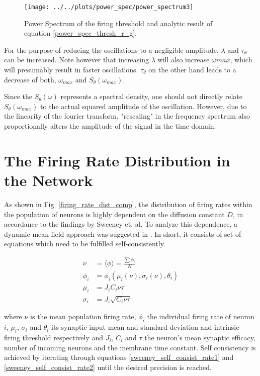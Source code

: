 \documentclass[10pt,a4paper]{article}
\begin{document}
\begin{figure}
\texttt{[image: ../../plots/power\_spec/power\_spectrum3]}
\caption{Power Spectrum of the firing threshold and analytic result of equation \eqref{power_spec_thresh_r_g}.}
\label{power_spec_thresh_sim_vs_an}
\end{figure}

For the purpose of reducing the oscillations to a negligible amplitude, $\lambda$ and $\tau_\theta$ can be increased. Note however that increasing $\lambda$ will also increase $\omega{max}$, which will presumably result in faster oscillations. $\tau_\theta$ on the other hand leads to a decrease of both, $\omega_{max}$ and $S_\theta(\omega_{max})$.

Since the $S_\theta(\omega)$ represents a spectral density, one should not directly relate $S_\theta(\omega_{max})$ to the actual squared amplitude of the oscillation. However, due to the linearity of the fourier transform, "rescaling" in the frequency spectrum also proportionally alters the amplitude of the signal in the time domain.    

\section{The Firing Rate Distribution in the Network}

As shown in Fig. \ref{firing_rate_dist_comp}, the distribution of firing rates within the population of neurons is highly dependent on the diffusion constant $D$, in accordance to the findings by Sweeney et. al. To analyze this dependence, a dynamic mean-field approach was suggested in \cite{Sweeney_Paper}. In short, it consists of set of equations which need to be fulfilled self-consistently.

\begin{align}
\nu &= \langle \phi \rangle = \frac{\sum \phi_i}{N} \label{sweeney_self_consist_rate1} \\
\phi_i &= \phi_i(\mu_i(\nu),\sigma_i(\nu),\theta_i) \label{sweeney_self_consist_rate2} \\
\mu_i &= J_iC_i\nu \tau \label{sweeney_self_consist_rate3} \\
\sigma_i &= J_i\sqrt{C_i\nu  \tau} \label{sweeney_self_consist_rate4}
\end{align}


where $\nu$ is the mean population firing rate, $\phi_i$ the individual firing rate of neuron $i$, $\mu_i$, $\sigma_i$ and $\theta_i$ its synaptic input mean and standard deviation and intrinsic firing threshold respectively and $J_i$, $C_i$ and $\tau$ the neuron's mean synaptic efficacy, number of incoming neurons and the membrane time constant. Self consistency is achieved by iterating through equations \eqref{sweeney_self_consist_rate1} and \eqref{sweeney_self_consist_rate2} until the desired precision is reached.
\end{document}
